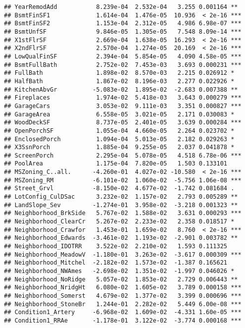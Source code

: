 \documentclass[
]{article}
\begin{document}
\begin{verbatim}
## YearRemodAdd           8.239e-04  2.532e-04   3.255 0.001164 ** 
## BsmtFinSF1             1.614e-04  1.476e-05  10.936  < 2e-16 ***
## BsmtFinSF2             1.153e-04  2.312e-05   4.986 6.98e-07 ***
## BsmtUnfSF              9.846e-05  1.305e-05   7.548 8.09e-14 ***
## X1stFlrSF              2.669e-04  1.638e-05  16.293  < 2e-16 ***
## X2ndFlrSF              2.570e-04  1.274e-05  20.169  < 2e-16 ***
## LowQualFinSF           2.394e-04  5.854e-05   4.090 4.58e-05 ***
## BsmtFullBath           2.752e-02  7.453e-03   3.693 0.000231 ***
## FullBath               1.898e-02  8.570e-03   2.215 0.026912 *  
## HalfBath               1.867e-02  8.196e-03   2.277 0.022926 *  
## KitchenAbvGr          -5.083e-02  1.895e-02  -2.683 0.007388 ** 
## Fireplaces             1.974e-02  5.418e-03   3.643 0.000279 ***
## GarageCars             3.053e-02  9.111e-03   3.351 0.000827 ***
## GarageArea             6.558e-05  3.021e-05   2.171 0.030083 *  
## WoodDeckSF             8.737e-05  2.401e-05   3.639 0.000284 ***
## OpenPorchSF            1.055e-04  4.660e-05   2.264 0.023702 *  
## EnclosedPorch          1.094e-04  5.013e-05   2.182 0.029263 *  
## X3SsnPorch             1.885e-04  9.255e-05   2.037 0.041878 *  
## ScreenPorch            2.295e-04  5.078e-05   4.518 6.78e-06 ***
## PoolArea               1.175e-04  7.820e-05   1.503 0.133101    
## MSZoning_C..all.      -4.260e-01  4.027e-02 -10.580  < 2e-16 ***
## MSZoning_RM           -6.101e-02  1.060e-02  -5.756 1.06e-08 ***
## Street_Grvl           -8.150e-02  4.677e-02  -1.742 0.081684 .  
## LotConfig_CulDSac      3.232e-02  1.157e-02   2.793 0.005289 ** 
## LandSlope_Sev         -1.274e-01  3.958e-02  -3.218 0.001323 ** 
## Neighborhood_BrkSide   5.767e-02  1.588e-02   3.631 0.000293 ***
## Neighborhood_ClearCr   5.267e-02  2.233e-02   2.358 0.018517 *  
## Neighborhood_Crawfor   1.453e-01  1.659e-02   8.760  < 2e-16 ***
## Neighborhood_Edwards  -3.461e-02  1.193e-02  -2.901 0.003782 ** 
## Neighborhood_IDOTRR    3.522e-02  2.210e-02   1.593 0.111325    
## Neighborhood_MeadowV  -1.180e-01  3.263e-02  -3.617 0.000309 ***
## Neighborhood_Mitchel  -2.182e-02  1.573e-02  -1.387 0.165621    
## Neighborhood_NWAmes   -2.698e-02  1.351e-02  -1.997 0.046026 *  
## Neighborhood_NoRidge   5.057e-02  1.853e-02   2.729 0.006443 ** 
## Neighborhood_NridgHt   6.080e-02  1.605e-02   3.789 0.000158 ***
## Neighborhood_Somerst   4.679e-02  1.377e-02   3.399 0.000696 ***
## Neighborhood_StoneBr   1.244e-01  2.282e-02   5.449 6.00e-08 ***
## Condition1_Artery     -6.968e-02  1.609e-02  -4.331 1.60e-05 ***
## Condition1_RRAe       -1.178e-01  3.122e-02  -3.774 0.000168 ***

\end{verbatim}
\end{document}
